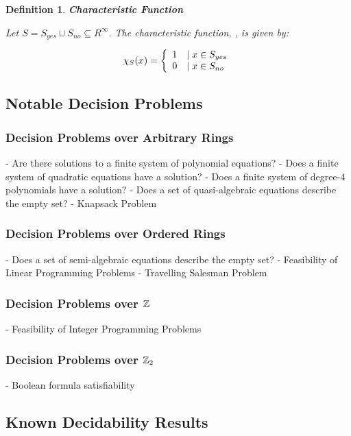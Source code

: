 \documentclass[twoside]{article}
\newtheorem{definition}{Definition}[section]
\begin{document}
  \begin{definition}{\textbf{Characteristic Function}}

    Let $S = S_{yes} \cup S_{no} \subseteq R^{\infty}$.  The
    characteristic function,
    , is given by:

    $$\chi_S(x) = \left\{ \begin{array}{ll} 1 & \mid x \in S_{yes} \\ 0 & \mid x \in S_{no} \end{array} \right.$$
  \end{definition}

  \subsection{Notable Decision Problems}

  \begin{itemize}
    \subsubsection{Decision Problems over Arbitrary Rings}
     - Are there solutions to a finite system of polynomial equations?
     - Does a finite system of quadratic equations have a solution?
     - Does a finite system of degree-4 polynomials have a solution?
     - Does a set of quasi-algebraic equations describe the empty set?  
     - Knapsack Problem
    
    \subsubsection{Decision Problems over Ordered Rings}
     - Does a set of semi-algebraic equations describe the empty set?
     - Feasibility of Linear Programming Problems
     - Travelling Salesman Problem
    
    \subsubsection{Decision Problems over $\mathbb{Z}$}
     - Feasibility of Integer Programming Problems

    \subsubsection{Decision Problems over $\mathbb{Z}_2$}
     - Boolean formula satisfiability
  \end{itemize}

  \subsection{Known Decidability Results}
\end{document}
